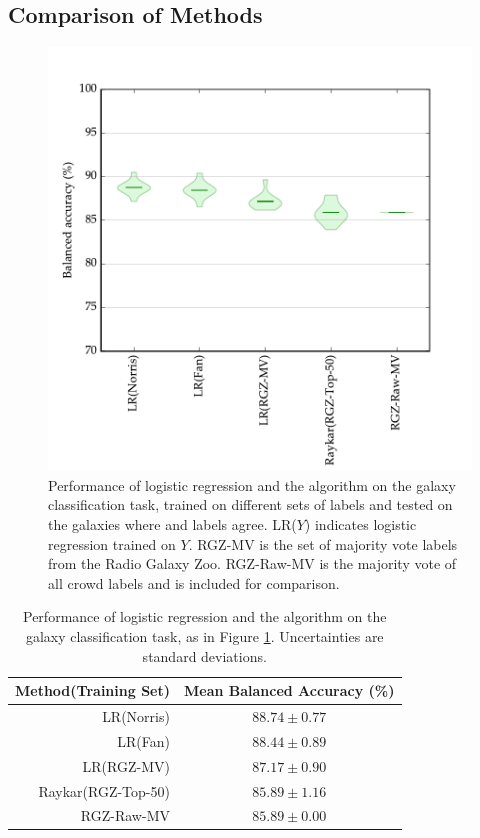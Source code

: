   \subsection{Comparison of Methods}
  \label{sec:comparison-predictors}

    \begin{figure}
      \centering
      \includegraphics[width=\textwidth]{images/experiments/predictors.pdf}
      \caption{Performance of logistic regression and the \citeauthor{raykar10}
        algorithm on the galaxy classification task, trained on different sets of
        labels and tested on the galaxies where \citeauthor{norris06} and
        \citeauthor{fan15} labels agree. LR($Y$) indicates logistic regression
        trained on $Y$. RGZ-MV is the set of majority vote labels from the Radio
        Galaxy Zoo. RGZ-Raw-MV is the majority vote of all crowd labels and is
        included for comparison.}
      \label{fig:predictors}
    \end{figure}

    \begin{table}
      \centering
      \begin{tabular}{r|c}
        \textbf{Method(Training Set)} & \textbf{Mean Balanced Accuracy (\%)}\\\hline
        LR(Norris) & $88.74 \pm 0.77$\\
        LR(Fan) & $88.44 \pm 0.89$\\
        LR(RGZ-MV) & $87.17 \pm 0.90$\\
        Raykar(RGZ-Top-50) & $85.89 \pm 1.16$\\
        RGZ-Raw-MV & $85.89 \pm 0.00$\\
      \end{tabular}
      \caption{Performance of logistic regression and the \citeauthor{raykar10}
        algorithm on the galaxy classification task, as in Figure
        \ref{fig:predictors}. Uncertainties are standard deviations.}
      \label{tab:predictors}
    \end{table}

